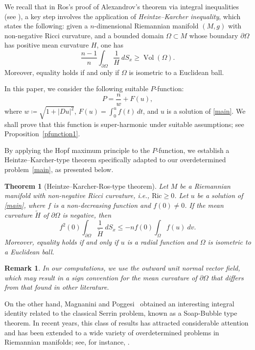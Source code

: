 \documentclass[12pt]{amsart}
\theoremstyle{plain}
\newtheorem{remark}{Remark}
\newtheorem{theorem}{\bf Theorem}
\numberwithin{equation}{section}
\begin{document}
We recall that in Ros’s proof of Alexandrov's theorem via integral inequalities (see \cite{ros}), a key step involves the application of \emph{Heintze–Karcher inequality}, which states the following: given a $n$-dimensional Riemannian manifold $(M, g)$ with non-negative Ricci curvature, and a bounded domain $\Omega \subset M$ whose boundary $\partial\Omega$ has positive mean curvature $H$, one has
\begin{equation*}%
\frac{n-1}{n} \int_{\partial\Omega} \frac{1}{H}~dS_x \geq \operatorname{Vol}(\Omega).
\end{equation*}
Moreover, equality holds if and only if $\Omega$ is isometric to a Euclidean ball.

In this paper, we consider the following suitable \( P \)-function:
\[
P = \frac{n}{w} + F(u),
\]
where \( w\coloneqq\sqrt{1 + |D u|^2} \), \(F(u)=\int_0^u f(t)\,dt\), and \( u \) is a solution of \eqref{main}. We shall prove that this function is super-harmonic under suitable assumptions; see Proposition~\ref{pfunction1}. 

By applying the Hopf maximum principle to the \( P \)-function, we establish a Heintze–Karcher-type theorem specifically adapted to our overdetermined problem~\eqref{main}, as presented below.

\begin{theorem}[Heintze–Karcher-Ros-type theorem]\label{HK}
Let \( M \) be a Riemannian manifold with non-negative Ricci curvature, i.e., \( \mathrm{Ric} \geq 0 \). Let \( u \) be a solution of \eqref{main}, where \( f \) is a non-decreasing function and \( f(0) \neq 0 \). If the mean curvature \( \widetilde{H} \) of \( \partial\Omega \) is negative, then
\[
f^2(0)\int_{\partial\Omega} \frac{1}{\widetilde{H}}~dS_x \leq -n f(0) \int_{\Omega} f(u)~dv.
\]
Moreover, equality holds if and only if \( u \) is a radial function and \( \Omega \) is isometric to a Euclidean ball.
\end{theorem}

\begin{remark}
In our computations, we use the outward unit normal vector field, which may result in a sign convention for the mean curvature of $\partial\Omega$ that differs from that found in other literature.
\end{remark}

On the other hand, Magnanini and Poggesi~\cite{poggesi} obtained an interesting integral identity related to the classical Serrin problem, known as a Soap-Bubble type theorem. In recent years, this class of results has attracted considerable attention and has been extended to a wide variety of overdetermined problems in Riemannian manifolds; see, for instance, \cite{araujo, FP, FRS, Gavitone, Magnanini2017, Magnanini2020, Ruan}.
\end{document}

